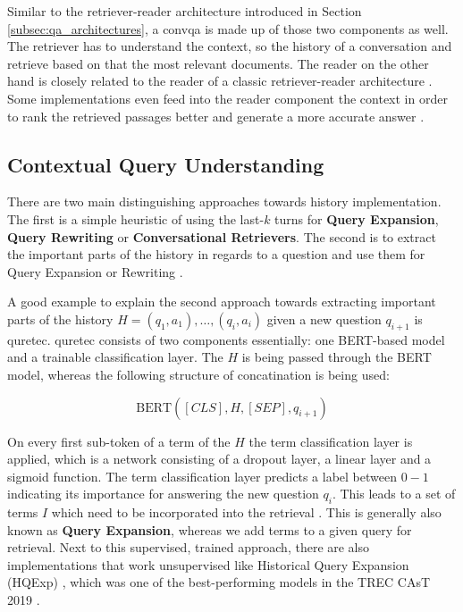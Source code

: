 Similar to the retriever-reader architecture introduced in Section \ref{subsec:qa_architectures}, a \gls{convqa} is made up of those two components as well. The retriever has to understand the context, so the history of a conversation and retrieve based on that the most relevant documents. The reader on the other hand is closely related to the reader of a classic retriever-reader architecture \cite{zamani_conversational_2023,gao_neural_2022}. Some implementations even feed into the reader component the context in order to rank the retrieved passages better and generate a more accurate answer \cite{owoicho_trec_2022}.

\subsection{Contextual Query Understanding}
\label{subsec:cqa_contextual_query_understanding}

There are two main distinguishing approaches towards history implementation. The first is a simple heuristic of using the last-$k$ turns for \textbf{Query Expansion}, \textbf{Query Rewriting} or \textbf{Conversational Retrievers}. The second is to extract the important parts of the history in regards to a question and use them for Query Expansion or Rewriting \cite{gao_neural_2022}.

A good example to explain the second approach towards extracting important parts of the history $H = {(q_1, a_1), \dots , (q_i, a_i)}$ given a new question $q_{i+1}$ is \gls{quretec}\cite{voskarides_query_2020}. \gls{quretec} consists of two components essentially: one BERT-based model and a trainable classification layer. The $H$ is being passed through the BERT model, whereas the following structure of concatination is being used: 

\begin{equation}
    \text{BERT}([CLS],H,[SEP],q_{i+1}) 
\end{equation}

On every first sub-token of a term of the $H$ the term classification layer is applied, which is a network consisting of a dropout layer, a linear layer and a sigmoid function. The term classification layer predicts a label between $0-1$ indicating its importance for answering the new question $q_i$. This leads to a set of terms $I$ which need to be incorporated into the retrieval \cite{voskarides_query_2020}. This is generally also known as \textbf{Query Expansion}, whereas we add terms to a given query for retrieval. Next to this supervised, trained approach, there are also implementations that work unsupervised like Historical Query Expansion (HQExp) \cite{yang_query_2019}, which was one of the best-performing models in the TREC CAsT 2019 \cite{dalton_trec_2020}.

